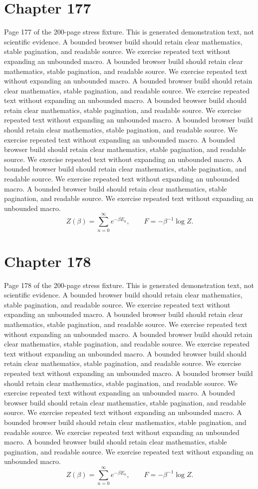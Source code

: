 \documentclass[11pt]{article}
\begin{document}
\section*{Chapter 177}
Page 177 of the 200-page stress fixture. This is generated demonstration text, not scientific evidence.
A bounded browser build should retain clear mathematics, stable pagination, and readable source. We exercise repeated text without expanding an unbounded macro.
A bounded browser build should retain clear mathematics, stable pagination, and readable source. We exercise repeated text without expanding an unbounded macro.
A bounded browser build should retain clear mathematics, stable pagination, and readable source. We exercise repeated text without expanding an unbounded macro.
A bounded browser build should retain clear mathematics, stable pagination, and readable source. We exercise repeated text without expanding an unbounded macro.
A bounded browser build should retain clear mathematics, stable pagination, and readable source. We exercise repeated text without expanding an unbounded macro.
A bounded browser build should retain clear mathematics, stable pagination, and readable source. We exercise repeated text without expanding an unbounded macro.
A bounded browser build should retain clear mathematics, stable pagination, and readable source. We exercise repeated text without expanding an unbounded macro.
A bounded browser build should retain clear mathematics, stable pagination, and readable source. We exercise repeated text without expanding an unbounded macro.
\[Z(\beta)=\sum_{n=0}^{\infty}e^{-\beta E_n},\qquad F=-\beta^{-1}\log Z.\]
\newpage
\section*{Chapter 178}
Page 178 of the 200-page stress fixture. This is generated demonstration text, not scientific evidence.
A bounded browser build should retain clear mathematics, stable pagination, and readable source. We exercise repeated text without expanding an unbounded macro.
A bounded browser build should retain clear mathematics, stable pagination, and readable source. We exercise repeated text without expanding an unbounded macro.
A bounded browser build should retain clear mathematics, stable pagination, and readable source. We exercise repeated text without expanding an unbounded macro.
A bounded browser build should retain clear mathematics, stable pagination, and readable source. We exercise repeated text without expanding an unbounded macro.
A bounded browser build should retain clear mathematics, stable pagination, and readable source. We exercise repeated text without expanding an unbounded macro.
A bounded browser build should retain clear mathematics, stable pagination, and readable source. We exercise repeated text without expanding an unbounded macro.
A bounded browser build should retain clear mathematics, stable pagination, and readable source. We exercise repeated text without expanding an unbounded macro.
A bounded browser build should retain clear mathematics, stable pagination, and readable source. We exercise repeated text without expanding an unbounded macro.
\[Z(\beta)=\sum_{n=0}^{\infty}e^{-\beta E_n},\qquad F=-\beta^{-1}\log Z.\]
\newpage
\end{document}
